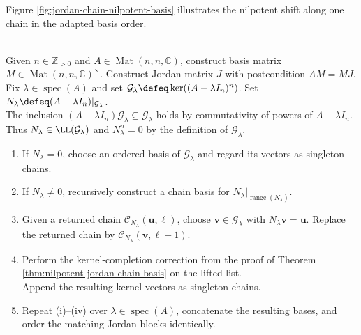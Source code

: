 Figure \ref{fig:jordan-chain-nilpotent-basis} illustrates the nilpotent shift along one chain in the adapted basis order.

\begin{illustrationfigure}[H]
  \centering
  
  \caption{An ordered nilpotent chain shifts left under $N$ and represents one Jordan block.}
  \label{fig:jordan-chain-nilpotent-basis}
\end{illustrationfigure}

\begin{computationmethod} \label{meth:recursive-range-lifting-jordan-construction} \\
Given $n\in\mathbb{Z}_{>0}$ and $A\in\operatorname{Mat}(n,n,\mathbb{C})$, construct basis matrix $M\in\operatorname{Mat}(n,n,\mathbb{C})^{\times}$. Construct Jordan matrix $J$ with postcondition $AM=MJ$.\\
Fix $\lambda\in\operatorname{spec}(A)$ and set $\mathcal{G}_{\lambda}\defeq\ker((A-\lambda I_n)^n)$. Set $N_{\lambda}\defeq(A-\lambda I_n)|_{\mathcal{G}_{\lambda}}$.\\
The inclusion $(A-\lambda I_n)\mathcal{G}_{\lambda}\subseteq\mathcal{G}_{\lambda}$ holds by commutativity of powers of $A-\lambda I_n$. Thus $N_{\lambda}\in\LL(\mathcal{G}_{\lambda})$ and $N_{\lambda}^n=0$ by the definition of $\mathcal{G}_{\lambda}$.
\begin{enumerate}[label=(\roman*)]
\setlength{\itemsep}{0pt}
\item If $N_{\lambda}=0$, choose an ordered basis of $\mathcal{G}_{\lambda}$ and regard its vectors as singleton chains.
\item If $N_{\lambda}\neq0$, recursively construct a chain basis for $N_{\lambda}|_{\operatorname{range}(N_{\lambda})}$.
\item Given a returned chain $\mathcal{C}_{N_{\lambda}}(\mathbf{u},\ell)$, choose $\mathbf{v}\in\mathcal{G}_{\lambda}$ with $N_{\lambda}\mathbf{v}=\mathbf{u}$. Replace the returned chain by $\mathcal{C}_{N_{\lambda}}(\mathbf{v},\ell+1)$.
\item Perform the kernel-completion correction from the proof of Theorem \ref{thm:nilpotent-jordan-chain-basis} on the lifted list.\\
Append the resulting kernel vectors as singleton chains.
\item Repeat (i)--(iv) over $\lambda\in\operatorname{spec}(A)$, concatenate the resulting bases, and order the matching Jordan blocks identically.

\end{enumerate}
\end{computationmethod}
